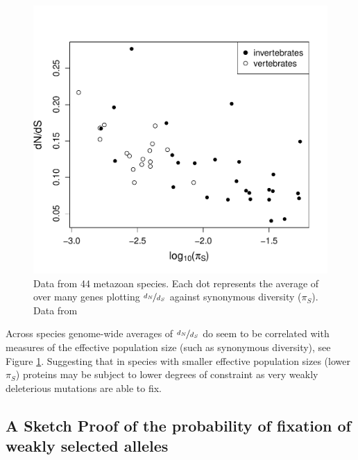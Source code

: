 
\begin{figure}
\begin{center}
\includegraphics[width=\textwidth]{Journal_figs/drift_selection/Galtier_dNdS/Galtier_dNdS.pdf}
\end{center}
\caption{Data from 44 metazoan species. Each dot represents the
  average of over many genes plotting $\nicefrac{d_N}{d_S}$ against synonymous
  diversity ($\pi_S$). Data from \citet{galtier2016adaptive} } \label{Galtier_dNdS}
\end{figure}

Across species genome-wide averages of $\nicefrac{d_N}{d_S}$ do seem to be
correlated with measures of the effective population size (such as
synonymous diversity), see Figure \ref{Galtier_dNdS}. Suggesting that in species with smaller effective
population sizes (lower $\pi_S$) proteins may be subject to lower degrees of
constraint as very weakly deleterious mutations are able to fix. 




\subsection{A Sketch Proof of the probability of fixation of
weakly selected alleles} \label{Section:fixation_weakly_sel}

